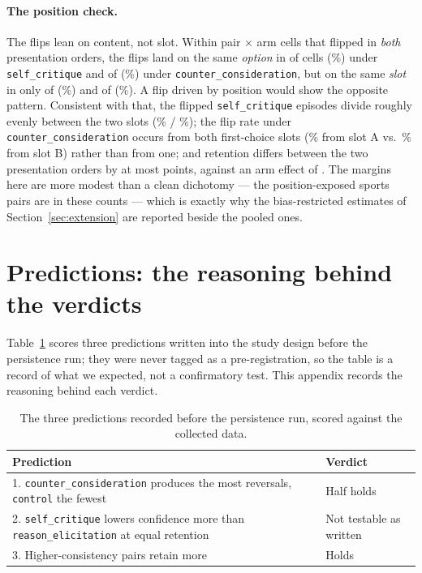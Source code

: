 \paragraph{The position check.} The flips lean on content, not slot. Within pair
$\times$ arm cells that flipped in \emph{both} presentation orders, the flips land on
the same \emph{option} in \pqxSameOptCritique{} of \pqxBothCritique{} cells
(\pqxSameOptPctCritique{}\%) under \texttt{self\_critique} and \pqxSameOptCounter{} of
\pqxBothCounter{} (\pqxSameOptPctCounter{}\%) under \texttt{counter\_consideration}, but
on the same \emph{slot} in only \pqxSameSlotCritique{} of \pqxBothCritique{}
(\pqxSameSlotPctCritique{}\%) and \pqxSameSlotCounter{} of \pqxBothCounter{}
(\pqxSameSlotPctCounter{}\%). A flip driven by position would show the opposite
pattern. Consistent with that, the \pqxFlipCritique{} flipped \texttt{self\_critique}
episodes divide roughly evenly between the two slots (\pqxFlipSlotA{}\% /
\pqxFlipSlotB{}\%); the flip rate under \texttt{counter\_consideration} occurs from both
first-choice slots (\pqxFlipBySlotA{}\% from slot A vs.\
\pqxFlipBySlotB{}\% from slot B) rather than from one; and retention differs between the two presentation orders by at
most \pqxOrdGapMax{} points, against an arm effect of \pqxeDiffCritique{}. The margins
here are more modest than a clean dichotomy --- the position-exposed sports pairs are in
these counts --- which is exactly why the bias-restricted estimates of
Section~\ref{sec:extension} are reported beside the pooled ones.

\section{Predictions: the reasoning behind the verdicts}
\label{app:predictions}

Table~\ref{tab:predictions} scores three predictions written into the study design
before the persistence run; they were never tagged as a pre-registration, so the table
is a record of what we expected, not a confirmatory test. This appendix records the
reasoning behind each verdict.

\begin{table}[h]
  \centering
  \small
  \begin{tabular}{p{10.2cm}l}
    \toprule
    Prediction & Verdict \\
    \midrule
    1. \texttt{counter\_consideration} produces the most reversals, \texttt{control} the
    fewest & Half holds \\
    2. \texttt{self\_critique} lowers confidence more than \texttt{reason\_elicitation}
    at equal retention & Not testable as written \\
    3. Higher-consistency pairs retain more & Holds \\
    \bottomrule
  \end{tabular}
  \caption{The three predictions recorded before the persistence run, scored against
  the collected data.}
  \label{tab:predictions}
\end{table}

